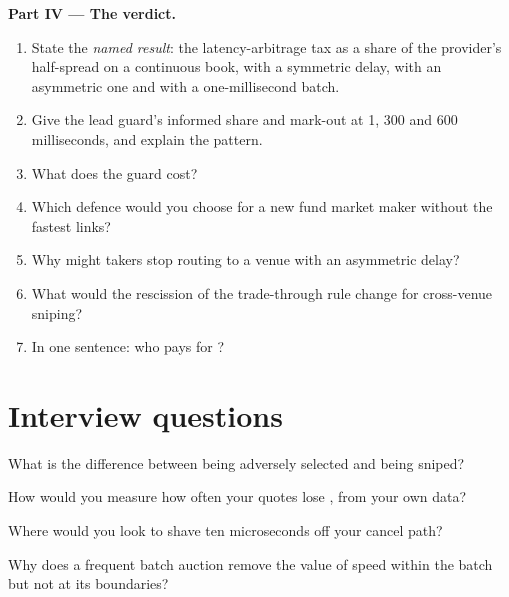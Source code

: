 \begin{problem}
\medskip\noindent\textbf{Part IV --- The verdict.}
\begin{enumerate}[resume]
\item State the \emph{named result}: the latency-arbitrage tax as a share of the provider's half-spread on a continuous book, with a symmetric delay,
with an asymmetric one and with a one-millisecond batch.
\item Give the lead guard's informed share and mark-out at 1, 300 and 600 milliseconds, and explain the pattern.
\item What does the guard cost?
\item Which defence would you choose for a new fund market maker without the fastest links?
\item Why might takers stop routing to a venue with an asymmetric delay?
\item What would the rescission of the trade-through rule change for cross-venue sniping?
\item In one sentence: who pays for ?
\end{enumerate}
\end{problem}

\section{Interview questions}

\begin{interviewq}\label{iq:hf:latency-arbitrage-and-its-defence:1}
What is the difference between being adversely selected and being sniped?
\end{interviewq}

\begin{interviewq}\label{iq:hf:latency-arbitrage-and-its-defence:2}
How would you measure how often your quotes lose , from your own data?
\end{interviewq}

\begin{interviewq}\label{iq:hf:latency-arbitrage-and-its-defence:3}
Where would you look to shave ten microseconds off your cancel path?
\end{interviewq}

\begin{interviewq}\label{iq:hf:latency-arbitrage-and-its-defence:4}
Why does a frequent batch auction remove the value of speed within the batch but not at its boundaries?
\end{interviewq}

